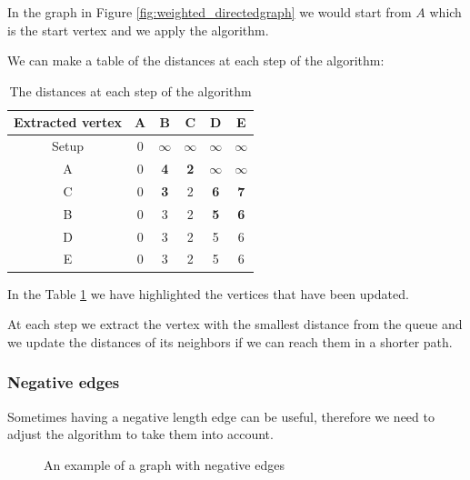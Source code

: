 \documentclass[12pt]{extarticle}
\begin{document}
In the graph in Figure \ref{fig:weighted_directedgraph} we would start from $A$ which is the start vertex and we apply the algorithm.

We can make a table of the distances at each step of the algorithm:

\begin{table}[H]
    \center
    \begin{tabular}{ |c|c|c|c|c|c| }
        \hline
        Extracted vertex & A & B          & C          & D          & E          \\
        \hline
        Setup            & 0 & $\infty$   & $\infty$   & $\infty$   & $\infty$   \\
        A                & 0 & \textbf{4} & \textbf{2} & $\infty$   & $\infty$   \\
        C                & 0 & \textbf{3} & 2          & \textbf{6} & \textbf{7} \\
        B                & 0 & 3          & 2          & \textbf{5} & \textbf{6} \\
        D                & 0 & 3          & 2          & 5          & 6          \\
        E                & 0 & 3          & 2          & 5          & 6          \\
        \hline
    \end{tabular}
    \caption{The distances at each step of the algorithm}
    \label{tab:dijsktra_distances}
\end{table}

In the Table \ref{tab:dijsktra_distances} we have highlighted the vertices that have been updated.

At each step we extract the vertex with the smallest distance from the queue and we update the distances of its neighbors if we can reach them in a shorter path.

\subsubsection{Negative edges}

Sometimes having a negative length edge can be useful, therefore we need to adjust the algorithm to take them into account.

\begin{figure}[H]
    \centering

    \caption{An example of a graph with negative edges}
    \label{fig:negative_edges}
\end{figure}
\end{document}
